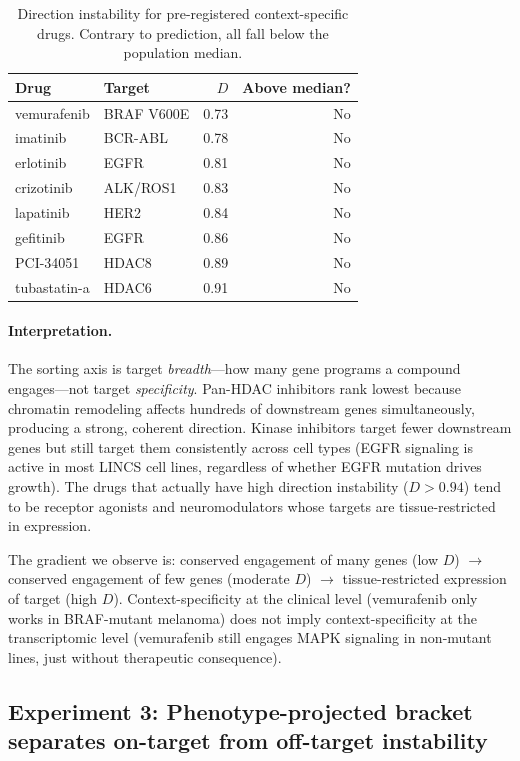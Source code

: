 \documentclass{article}
\begin{document}
\begin{table}[t]
\centering
\caption{Direction instability for pre-registered context-specific drugs.
Contrary to prediction, all fall below the population median.}
\label{tab:specific}
\small
\begin{tabular}{llrr}
\toprule
Drug & Target & $D$ & Above median? \\
\midrule
vemurafenib & BRAF V600E & 0.73 & No \\
imatinib & BCR-ABL & 0.78 & No \\
erlotinib & EGFR & 0.81 & No \\
crizotinib & ALK/ROS1 & 0.83 & No \\
lapatinib & HER2 & 0.84 & No \\
gefitinib & EGFR & 0.86 & No \\
PCI-34051 & HDAC8 & 0.89 & No \\
tubastatin-a & HDAC6 & 0.91 & No \\
\bottomrule
\end{tabular}
\end{table}

\paragraph{Interpretation.}
The sorting axis is target \emph{breadth}---how many gene programs a compound
engages---not target \emph{specificity}. Pan-HDAC inhibitors rank lowest
because chromatin remodeling affects hundreds of downstream genes
simultaneously, producing a strong, coherent direction. Kinase inhibitors
target fewer downstream genes but still target them consistently across cell
types (EGFR signaling is active in most LINCS cell lines, regardless of
whether EGFR mutation drives growth). The drugs that actually have high
direction instability ($D > 0.94$) tend to be receptor agonists and
neuromodulators whose targets are tissue-restricted in expression.

The gradient we observe is: conserved engagement of many genes (low $D$)
$\to$ conserved engagement of few genes (moderate $D$) $\to$ tissue-restricted
expression of target (high $D$). Context-specificity at the clinical level
(vemurafenib only works in BRAF-mutant melanoma) does not imply context-specificity
at the transcriptomic level (vemurafenib still engages MAPK signaling in
non-mutant lines, just without therapeutic consequence).

\subsection{Experiment 3: Phenotype-projected bracket separates on-target from off-target instability}
\end{document}
